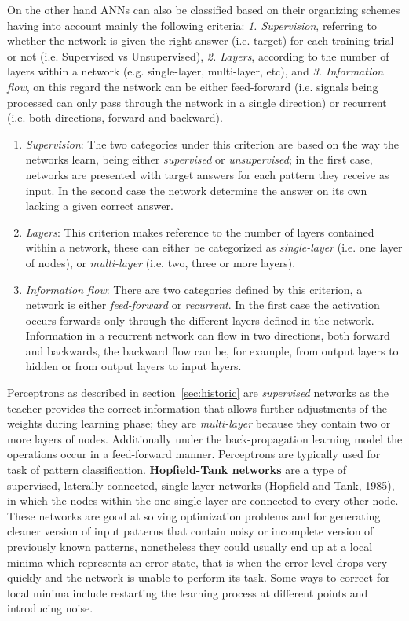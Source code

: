 \documentclass{WileySev}
\begin{document}
On the other hand ANNs can also be classified based on their organizing schemes having into account mainly the following criteria: \textit{1. Supervision}, referring to whether the network is given the right answer (i.e. target) for each training trial or not (i.e. Supervised vs Unsupervised), \textit{2. Layers}, according to the number of layers within a network (e.g. single-layer, multi-layer, etc), and \textit{3. Information flow}, on this regard the network can be either feed-forward (i.e. signals being processed can only pass through the network in a single direction) or recurrent (i.e. both directions, forward and backward).

\begin{enumerate}
  \item{\textit{Supervision}: The two categories under this criterion are based on the way the networks learn, being either \textit{supervised} or \textit{unsupervised}; in the first case, networks are presented with target answers for each pattern they receive as input. In the second case the network determine the answer on its own lacking a given correct answer.}
  \item{\textit{Layers}: This criterion makes reference to the number of layers contained within a network, these can either be categorized as \textit{single-layer} (i.e. one layer of nodes), or \textit{multi-layer} (i.e. two, three or more layers).}
  \item{\textit{Information flow}: There are two categories defined by this criterion, a network is either \textit{feed-forward} or \textit{recurrent}. In the first case the activation occurs forwards only through the different layers defined in the network. Information in a recurrent network can flow in two directions, both forward and backwards, the backward flow can be, for example, from output layers to hidden or from output layers to input layers.}
\end{enumerate}

Perceptrons as described in section~\ref{sec:historic} are \textit{supervised} networks as the teacher provides the correct information that allows further adjustments of the weights during learning phase; they are \textit{multi-layer} because they contain two or more layers of nodes. Additionally under the back-propagation learning model the operations occur in a feed-forward manner. Perceptrons are typically used for task of pattern classification. \textbf{Hopfield-Tank networks} are a type of supervised, laterally connected, single layer networks (Hopfield and Tank, 1985), in which the nodes  within the one single layer are connected to every other node. These networks are good at solving optimization problems and for generating cleaner version of input patterns that contain noisy or incomplete version of previously known patterns, nonetheless they could usually end up at a local minima which represents an error state, that is when the error level drops very quickly and the network is unable to perform its task. Some ways to correct for local minima include restarting the learning process at different points and introducing noise.
\end{document}
